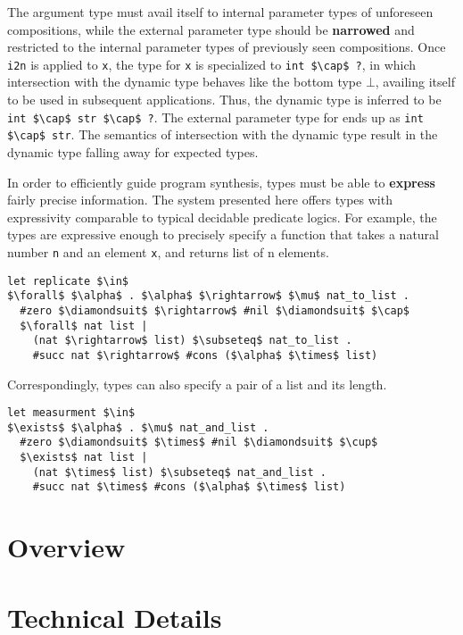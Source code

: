 \documentclass[sigplan,screen]{acmart}
\begin{document}
The argument type must avail itself to internal parameter types of unforeseen compositions,
while the external parameter type should be \textbf{narrowed} and restricted 
to the internal parameter types of previously seen compositions.
Once \lstinline{i2n} is applied to \lstinline{x}, 
the type for \lstinline{x} is specialized to \lstinline{int $\cap$ ?}, 
in which intersection with the dynamic type behaves like the bottom type $\bot$,
availing itself to be used in subsequent applications. 
Thus, the dynamic type is inferred to be \lstinline{int $\cap$ str $\cap$ ?}.
The external parameter type for ends up as \lstinline{int $\cap$ str}. 
The semantics of intersection with the dynamic type result in the dynamic type
falling away for expected types.



In order to efficiently guide program synthesis, 
types must be able to \textbf{express} fairly precise information. 
The system presented here offers types with 
expressivity comparable to typical decidable predicate logics. 
For example, the types are expressive enough to precisely specify
a function that takes a natural number \lstinline{n} 
and an element \lstinline{x}, 
and returns list of n elements.

\begin{lstlisting}[]
let replicate $\in$ 
$\forall$ $\alpha$ . $\alpha$ $\rightarrow$ $\mu$ nat_to_list .
  #zero $\diamondsuit$ $\rightarrow$ #nil $\diamondsuit$ $\cap$ 
  $\forall$ nat list | 
    (nat $\rightarrow$ list) $\subseteq$ nat_to_list .
    #succ nat $\rightarrow$ #cons ($\alpha$ $\times$ list)
\end{lstlisting}

\noindent Correspondingly, types can also specify a pair of a list and its length.

\begin{lstlisting}[]
let measurment $\in$ 
$\exists$ $\alpha$ . $\mu$ nat_and_list .
  #zero $\diamondsuit$ $\times$ #nil $\diamondsuit$ $\cup$ 
  $\exists$ nat list | 
    (nat $\times$ list) $\subseteq$ nat_and_list .
    #succ nat $\times$ #cons ($\alpha$ $\times$ list)
\end{lstlisting}



\section{Overview}

\section{Technical Details}
\end{document}
